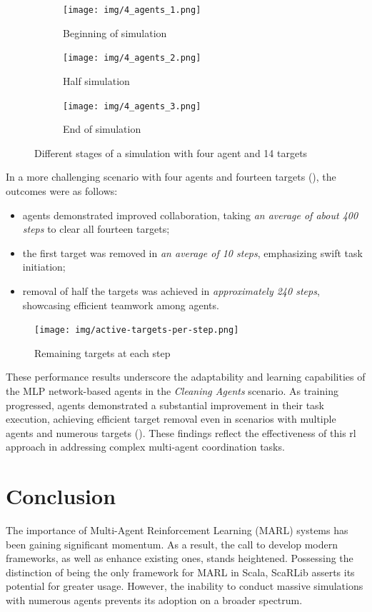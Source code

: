 \documentclass[12pt,a4paper,openright,twoside]{book}
\begin{document}
\begin{figure}
  \centering
  \begin{subfigure}[b]{0.45\textwidth}
      \centering
      \texttt{[image: img/4\_agents\_1.png]}
      \caption{Beginning of simulation}
  \end{subfigure}
  \hfill
  \begin{subfigure}[b]{0.45\textwidth}
      \centering
      \texttt{[image: img/4\_agents\_2.png]}
      \caption{Half simulation}
  \end{subfigure}
  \hfill
  \begin{subfigure}[b]{0.45\textwidth}
      \centering
      \texttt{[image: img/4\_agents\_3.png]}
      \caption{End of simulation} 
  \end{subfigure}
  \caption{Different stages of a simulation with four agent and 14 targets}
  \label{fig:n}
\end{figure}

In a more challenging scenario with four agents and fourteen targets (), the outcomes were as follows:
\begin{itemize}
  \item agents demonstrated improved collaboration, taking \emph{an average of about 400 steps} to clear all fourteen targets;
  \item the first target was removed in \emph{an average of 10 steps}, emphasizing swift task initiation;
  \item removal of half the targets was achieved in \emph{approximately 240 steps}, showcasing efficient teamwork among agents.
\end{itemize}

\begin{figure}
\texttt{[image: img/active-targets-per-step.png]}
\caption{Remaining targets at each step}
\label{fig:o}
\end{figure}

These performance results underscore the adaptability and learning capabilities of the MLP network-based agents in the \emph{Cleaning Agents} scenario. As training progressed, agents demonstrated a substantial improvement in their task execution, achieving efficient target removal even in scenarios with multiple agents and numerous targets ().
These findings reflect the effectiveness of this \ac{rl} approach in addressing complex multi-agent coordination tasks.

\newpage

\chapter{Conclusion}
\label{chap:conclusion}
The importance of Multi-Agent Reinforcement Learning (MARL) systems has been gaining significant momentum. As a result, the call to develop modern frameworks, as well as enhance existing ones, stands heightened. Possessing the distinction of being the only framework for MARL in Scala, ScaRLib asserts its potential for greater usage. However, the inability to conduct massive simulations with numerous agents prevents its adoption on a broader spectrum.
\end{document}
